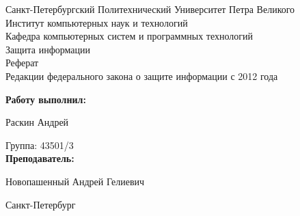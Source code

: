 \documentclass[14pt,a4paper,report]{article}
\begin{document}
\begin{titlepage} %

\begin{center} %

\large Санкт-Петербургский Политехнический Университет Петра Великого\\
\large Институт компьютерных наук и технологий \\
\large Кафедра компьютерных систем и программных технологий\\[6cm]

\huge Защита информации\\[0.5cm] %
\large Реферат\\[0.1cm]
\large Редакции федерального закона о защите информации с 2012 года\\[5cm]
\end{center}

\begin{flushright}
\begin{minipage}{0.5\textwidth}
\begin{flushright}
\textbf{Работу выполнил:}

Раскин Андрей

{Группа:} 43501/3\\


\textbf{Преподаватель:} 

Новопашенный Андрей Гелиевич 
\end{flushright}
\end{minipage} %
\end{flushright} %

\vfill %

\begin{center}

\large Санкт-Петербург\\
\large \the\year %

\end{center} %

\thispagestyle{empty} %
\end{titlepage} %

\vfill %

\tableofcontents
\end{document}
